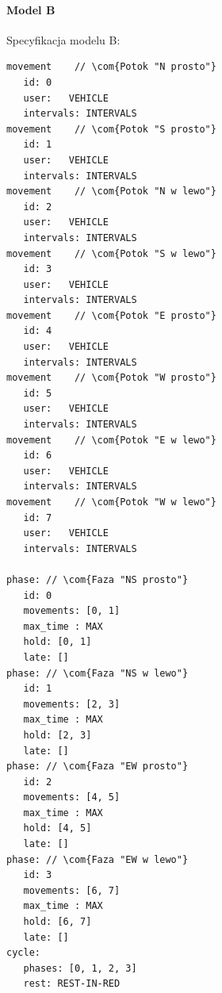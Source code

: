 \documentclass{pracamgr}
\theoremstyle{plain}
\newcommand{\com}[1]{\upshape\color{light-gray}{#1}}
\begin{document}
\paragraph {Model B} Specyfikacja modelu B:

\begin{lstlisting}[caption=Specyfikacja modelu B.]
movement    // \com{Potok "N prosto"}
   id: 0    
   user:   VEHICLE
   intervals: INTERVALS
movement    // \com{Potok "S prosto"}
   id: 1    
   user:   VEHICLE
   intervals: INTERVALS
movement    // \com{Potok "N w lewo"}
   id: 2    
   user:   VEHICLE
   intervals: INTERVALS
movement    // \com{Potok "S w lewo"}
   id: 3    
   user:   VEHICLE
   intervals: INTERVALS
movement    // \com{Potok "E prosto"}
   id: 4    
   user:   VEHICLE
   intervals: INTERVALS
movement    // \com{Potok "W prosto"}
   id: 5    
   user:   VEHICLE
   intervals: INTERVALS
movement    // \com{Potok "E w lewo"}
   id: 6    
   user:   VEHICLE
   intervals: INTERVALS
movement    // \com{Potok "W w lewo"}
   id: 7    
   user:   VEHICLE
   intervals: INTERVALS

phase: // \com{Faza "NS prosto"}
   id: 0
   movements: [0, 1]
   max_time : MAX
   hold: [0, 1]
   late: []
phase: // \com{Faza "NS w lewo"}
   id: 1
   movements: [2, 3]
   max_time : MAX
   hold: [2, 3]
   late: []
phase: // \com{Faza "EW prosto"}
   id: 2
   movements: [4, 5]
   max_time : MAX
   hold: [4, 5]
   late: []
phase: // \com{Faza "EW w lewo"}
   id: 3
   movements: [6, 7]
   max_time : MAX
   hold: [6, 7]
   late: []
cycle:
   phases: [0, 1, 2, 3]
   rest: REST-IN-RED
\end{lstlisting}

{}

\end{document}

